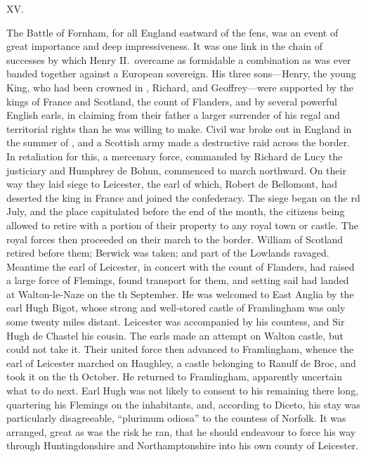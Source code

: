 \documentclass[10pt]{book}
\begin{document}
{\vspace{.3cm}
\begin{center}
XV.
\end{center}
\noindent The Battle of Fornham, for all England eastward of the fens, was an event of great importance and deep impressiveness. It was one link in the chain of successes by which Henry II.\ overcame as formidable a combination as was ever banded together against a European sovereign. His three sons---Henry, the young King, who had been crowned in , Richard, and Geoffrey---were supported by the kings of France and Scotland, the count of Flanders, and by several powerful English earls, in claiming from their father a larger surrender of his regal and territorial rights than he was willing to make. Civil war broke out in England in the summer of , and a Scottish army made a destructive raid across the border. In retaliation for this, a mercenary force, commanded by Richard de Lucy the justiciary and Humphrey de Bohun, commenced to march northward. On their way they laid siege to Leicester, the earl of which, Robert de Bellomont, had deserted the king in France and joined the confederacy. The siege began on the rd July, and the place capitulated before the end of the month, the citizens being allowed to retire with a portion of their property to any royal town or castle. The royal forces then proceeded on their march to the border. William of Scotland retired before them; Berwick was taken; and part of the Lowlands ravaged. Meantime the earl of Leicester, in concert with the count of Flanders, had raised a large force of Flemings, found transport for them, and setting sail had landed at Walton-le-Naze on the th September. He was welcomed to East Anglia by the earl Hugh Bigot, whose strong and well-stored castle of Framlingham was only some twenty miles distant. Leicester was accompanied by his countess, and Sir Hugh de Chastel his cousin. The earls made an attempt on Walton castle, but could not take it. Their united force then advanced to Framlingham, whence the earl of Leicester marched on Haughley, a castle belonging to Ranulf de Broc, and took it on the th October. He returned to Framlingham, apparently uncertain what to do next. Earl Hugh was not likely to consent to his remaining there long, quartering his Flemings on the inhabitants, and, according to Diceto, his stay was particularly disagreeable, ``plurimum odiosa'' to the countess of Norfolk. It was arranged, great as was the risk he ran, that he should endeavour to force his way through Huntingdonshire and Northamptonshire into his own county of Leicester.

}
\end{document}
